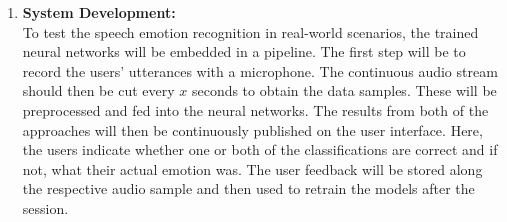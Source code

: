 \begin{enumerate}
\color{black}
\item \textbf{System Development:} \\
To test the speech emotion recognition in real-world scenarios, the trained neural networks will be embedded in a pipeline. 
The first step will be to record the users' utterances with a microphone. The continuous audio stream should then be cut every $x$ seconds to obtain the data samples. These will be preprocessed and fed into the neural networks. The results from both of the approaches will then be continuously published on the user interface. Here, the users indicate whether one or both of the classifications are correct and if not, what their actual emotion was. The user feedback will be stored along the respective audio sample and then used to retrain the models after the session. 
\color{blue}
\end{enumerate}

